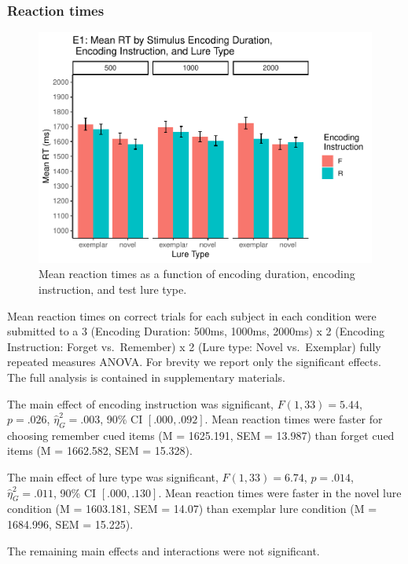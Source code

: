 \documentclass[
  english,
  man,floatsintext]{apa6}
\begin{document}
\hypertarget{reaction-times}{%
\subsubsection{Reaction times}\label{reaction-times}}

\begin{figure}
\centering
\includegraphics{honorsThesis_NEW_files/figure-latex/E1fig2-1.pdf}
\caption{\label{fig:E1fig2}Mean reaction times as a function of encoding duration, encoding instruction, and test lure type.}
\end{figure}

Mean reaction times on correct trials for each subject in each condition were submitted to a 3 (Encoding Duration: 500ms, 1000ms, 2000ms) x 2 (Encoding Instruction: Forget vs.~Remember) x 2 (Lure type: Novel vs.~Exemplar) fully repeated measures ANOVA. For brevity we report only the significant effects. The full analysis is contained in supplementary materials.

The main effect of encoding instruction was significant, \(F(1, 33) = 5.44\), \(p = .026\), \(\hat{\eta}^2_G = .003\), 90\% CI \([.000, .092]\). Mean reaction times were faster for choosing remember cued items (M = 1625.191, SEM = 13.987) than forget cued items (M = 1662.582, SEM = 15.328).

The main effect of lure type was significant, \(F(1, 33) = 6.74\), \(p = .014\), \(\hat{\eta}^2_G = .011\), 90\% CI \([.000, .130]\). Mean reaction times were faster in the novel lure condition (M = 1603.181, SEM = 14.07) than exemplar lure condition (M = 1684.996, SEM = 15.225).

The remaining main effects and interactions were not significant.
\end{document}
